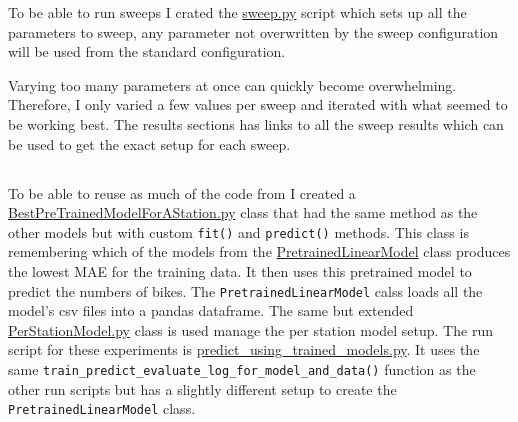 \documentclass[a4paper]{article}
\begin{document}
    To be able to run sweeps I crated the \href{https://github.com/isabelladegen/mlp-2021/blob/fba40c1f27f066e1c5413c45a50c90a32a018f81/src/sweep.py}{sweep.py}
    script which sets up all the parameters to sweep, any parameter not overwritten by the
    sweep configuration will be used from the standard configuration.

    Varying too many parameters at once can quickly become overwhelming. Therefore, I only varied a few values per sweep
    and iterated with what seemed to be working best. The results sections has links to all the sweep results which
    can be used to get the exact setup for each sweep.


    \subsection*{}
    To be able to reuse as much of the code from  I created a
    \href{https://github.com/isabelladegen/mlp-2021/blob/fba40c1f27f066e1c5413c45a50c90a32a018f81/src/models/BestPreTrainedModelForAStation.py}{BestPreTrainedModelForAStation.py}
    class that had the same method as the other models but with custom \texttt{fit()} and \texttt{predict()} methods.
    This class is remembering which of the models from the \href{https://github.com/isabelladegen/mlp-2021/blob/fba40c1f27f066e1c5413c45a50c90a32a018f81/src/Data.py#L29}{PretrainedLinearModel}
    class produces the lowest MAE for the training data. It then uses this pretrained model to predict the numbers of bikes.
    The \texttt{PretrainedLinearModel} calss loads all the model's csv files into a pandas dataframe. The same but extended
    \href{https://github.com/isabelladegen/mlp-2021/blob/fba40c1f27f066e1c5413c45a50c90a32a018f81/src/models/PerStationModel.py}{PerStationModel.py}
    class is used manage the per station model setup. The run script for these experiments is \href{https://github.com/isabelladegen/mlp-2021/blob/fba40c1f27f066e1c5413c45a50c90a32a018f81/src/predict_using_trained_models.py}{predict\_using\_trained\_models.py}.
    It uses the same \texttt{train\_predict\_evaluate\_log\_for\_model\_and\_data()} function
    as the other run scripts but has a slightly different setup to create the \texttt{PretrainedLinearModel} class.


    \subsection*{}
\end{document}
